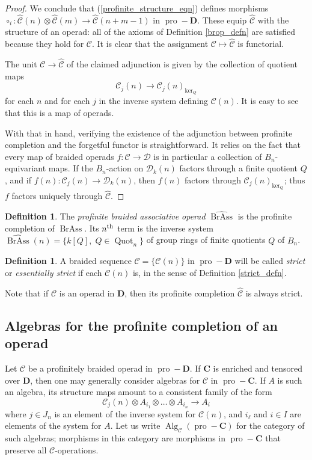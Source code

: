 \documentclass[12pt]{article}
\DeclareMathOperator{\Alg}{Alg}
\DeclareMathOperator{\Quot}{Quot}
\DeclareMathOperator{\pro}{pro}
\DeclareMathOperator{\BrAss}{BrAss}
\newcommand{\BrAsshat}{\widehat{\BrAss}} %
\newcommand{\CC} {\mathcal{C}}
\newcommand{\CChat}{\widehat{\CC}}
\newcommand{\DD} {\mathcal{D}}
\newcommand{\bC} {\mathbf{C}}
\newcommand{\bD} {\mathbf{D}}
\newcommand{\proD}{\pro\!-\bD}
\newcommand{\nth}{\textsuperscript{th}}
\theoremstyle{plain}
\theoremstyle{definition}
\newtheorem{defn}[thm]{Definition}
\theoremstyle{remark}
\begin{document}
\begin{proof}
We conclude that (\ref{profinite_structure_eqn}) defines morphisms $\circ_i: \widehat{\CC}(n) \otimes \widehat{\CC}(m) \to \widehat{\CC}(n+m-1)$ in $\proD$.  These equip $\widehat{\CC}$ with the structure of an operad: all of the axioms of Definition \ref{brop_defn} are satisfied because they hold for $\CC$. It is clear that the assignment $\CC \mapsto \widehat{\CC}$ is functorial.  

The unit $\CC \to \widehat{\CC}$ of the claimed adjunction is given by the collection of quotient maps 
%
$$\CC_j(n) \to \CC_j(n)_{\ker_Q}$$
%
for each $n$ and for each $j$ in the inverse system defining $\CC(n)$.  It is easy to see that this is a map of operads.

With that in hand, verifying the existence of the adjunction between profinite completion and the forgetful functor is straightforward.  It relies on the fact that every map of braided operads $f: \CC \to \DD$ is in particular a collection of $B_n$-equivariant maps.  If the $B_n$-action on $\DD_k(n)$ factors through a finite quotient $Q$, and if $f(n): \CC_j(n) \to \DD_k(n)$, then $f(n)$ factors through $\CC_j(n)_{\ker_Q}$; thus $f$ factors uniquely through $\widehat{\CC}$.

\end{proof} 

\begin{defn} The \emph{profinite braided associative operad} $\BrAsshat$ is the profinite completion of $\BrAss$.  Its $n\nth$ term is the inverse system $\BrAsshat(n) = \{k[Q], \; Q \in \Quot_n\}$ of group rings of finite quotients $Q$ of $B_n$. \end{defn}

\begin{defn} A braided sequence $\CC = \{\CC(n)\}$ in $\pro-\bD$ will be called \emph{strict} or \emph{essentially strict} if each $\CC(n)$ is, in the sense of Definition \ref{strict_defn}. \end{defn}

Note that if $\CC$ is an operad in $\bD$, then its profinite completion $\CChat$ is always strict.

\subsection{Algebras for the profinite completion of an operad} \label{profinite_algebra_section}

Let $\CC$ be a profinitely braided operad in $\pro-\bD$.  If $\bC$ is enriched and tensored over $\bD$, then one may generally consider algebras for $\CC$ in $\pro-\bC$.  If $A$ is such an algebra, its structure maps amount to a consistent family of the form
%
$$\CC_j(n) \otimes A_{i_1} \otimes \dots \otimes A_{i_n} \to A_i$$
%
where $j \in J_n$ is an element of the inverse system for $\CC(n)$, and $i_\ell$ and $i \in I$ are elements of the system for $A$. Let us write $\Alg_{\CC}(\pro-\bC)$ for the category of such algebras; morphisms in this category are morphisms in $\pro-\bC$ that preserve all $\CC$-operations.
\end{document}
